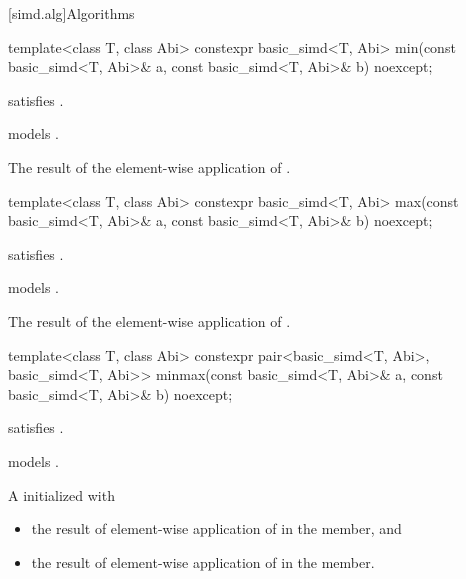 [simd.alg]{Algorithms}

\begin{itemdecl}
template<class T, class Abi>
  constexpr basic_simd<T, Abi> min(const basic_simd<T, Abi>& a, const basic_simd<T, Abi>& b) noexcept;
\end{itemdecl}

\begin{itemdescr}
  \pnum\constraints
   satisfies .

  \pnum\expects
   models .

  \pnum\returns
  The result of the element-wise application of  \foralli.
\end{itemdescr}

\begin{itemdecl}
template<class T, class Abi>
  constexpr basic_simd<T, Abi> max(const basic_simd<T, Abi>& a, const basic_simd<T, Abi>& b) noexcept;
\end{itemdecl}

\begin{itemdescr}
  \pnum\constraints
   satisfies .

  \pnum\expects
   models .

  \pnum\returns
  The result of the element-wise application of  \foralli.
\end{itemdescr}

\begin{itemdecl}
template<class T, class Abi>
  constexpr pair<basic_simd<T, Abi>, basic_simd<T, Abi>>
  minmax(const basic_simd<T, Abi>& a, const basic_simd<T, Abi>& b) noexcept;
\end{itemdecl}

\begin{itemdescr}
  \pnum\constraints
   satisfies .

  \pnum\expects
   models .

  \pnum\returns
  A  initialized with
  \begin{itemize}
    \item the result of element-wise application of  \foralli{} in the  member, and
    \item the result of element-wise application of  \foralli{} in the  member.
  \end{itemize}
\end{itemdescr}

